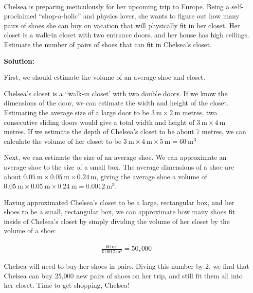\vspace{0.25cm}
\begin{problem}\\Chelsea is preparing meticulously for her upcoming trip to Europe. Being a self-proclaimed ``shop-a-holic'' and physics lover, she wants to figure out how many pairs of shoes she can buy on vacation that will physically fit in her closet. Her closet is a walk-in closet with two entrance doors, and her house has high ceilings. Estimate the number of pairs of shoes that can fit in Chelsea's closet.

\textbf{Solution:}

First, we should estimate the volume of an average shoe and closet.

Chelsea's closet is a ``walk-in closet' with two double doors. If we know the dimensions of the door, we can estimate the width and height of the closet. Estimating the average size of a large door to be $\SI{3}{\meter}\times \SI{2}{\meter}$ metres, two consecutive sliding doors would give a total width and height of $\SI{3}{\meter}\times \SI{4}{\meter}$ metres. If we estimate the depth of Chelsea's closet to be about 7 metres, we can calculate the volume of her closet to be $\SI{3}{\meter}\times \SI{4}{\meter}\times \SI{5}{\meter} = \SI{60}{\meter\cubed}$


Next, we can estimate the size of an average shoe. We can approximate an average shoe to the size of a small box. The average dimensions of a shoe are about $\SI{0.05}{\meter}\times \SI{0.05}{\meter}\times \SI{0.24}{\meter}$, giving the average shoe a volume of $\SI{0.05}{\meter}\times \SI{0.05}{\meter}\times \SI{0.24}{\meter} = \SI{0.0012}{\meter\cubed}$.


Having approximated Chelsea's closet to be a large, rectangular box, and her shoes to be a small, rectangular box, we can approximate how many shoes fit inside of Chelsea's closet by simply dividing the volume of her closet by the volume of a shoe:

\begin{align*}
\frac{\SI{60}{\meter\cubed}}{\SI{0.0012}{\meter\cubed}}= 50,000 
\end{align*}

Chelsea will need to buy her shoes in pairs. Diving this number by 2, we find that Chelsea can buy 25,000 new pairs of shoes on her trip, and still fit them all into her closet. Time to get shopping, Chelsea!\end{problem}